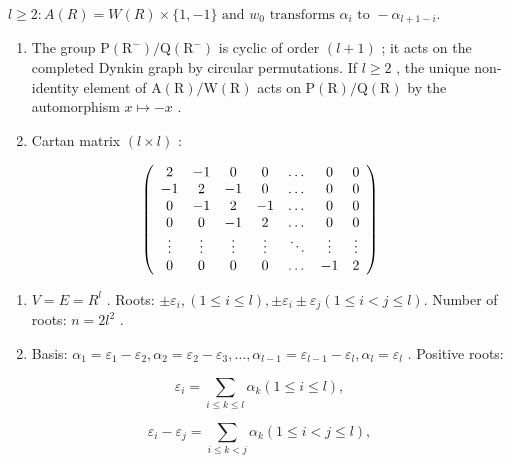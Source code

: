 \(l \geqslant 2: A(R) = W(R) \times \{1, -1\} \text{ and } w_{0} \text{ transforms } \alpha_{i} \text{ to } -\alpha_{l+1-i}.\)

\begin{enumerate}
\def\labelenumi{(\Roman{enumi})}
\setcounter{enumi}{11}
\item
  The group \(\mathrm{P}(\mathrm{R}^{-})/\mathrm{Q}(\mathrm{R}^{-})\) is cyclic of order \((l+1)\) ; it acts on the completed Dynkin graph by circular permutations. If \(l \geqslant 2\) , the unique non-identity element of \(\mathrm{A}(\mathrm{R})/\mathrm{W}(\mathrm{R})\) acts on \(\mathrm{P}(\mathrm{R})/\mathrm{Q}(\mathrm{R})\) by the automorphism \(x \mapsto -x\) .
\item
  Cartan matrix \((l \times l)\) :
\end{enumerate}

\[
\left( \begin{array}{c c c c c c c} 2 & - 1 & 0 & 0 & \dots & 0 & 0 \\ - 1 & 2 & - 1 & 0 & \dots & 0 & 0 \\ 0 & - 1 & 2 & - 1 & \dots & 0 & 0 \\ 0 & 0 & - 1 & 2 & \dots & 0 & 0 \\ \vdots & \vdots & \vdots & \vdots & \ddots & \vdots & \vdots \\ 0 & 0 & 0 & 0 & \dots & - 1 & 2 \end{array} \right)
\]


\begin{enumerate}
\def\labelenumi{(\Roman{enumi})}
\item
  \(V = E = R^{l}\) . Roots: \(\pm\varepsilon_{i}, (1\leqslant i\leqslant l), \pm\varepsilon_{i}\pm\varepsilon_{j} (1\leqslant i<j\leqslant l).\) Number of roots: \(n = 2l^{2}\) .
\item
  Basis: \(\alpha_{1} = \varepsilon_{1} - \varepsilon_{2},\alpha_{2} = \varepsilon_{2} - \varepsilon_{3},\ldots ,\alpha_{l - 1} = \varepsilon_{l - 1} - \varepsilon_{l},\alpha_{l} = \varepsilon_{l}\) . Positive roots:
\end{enumerate}

\[
\varepsilon_ {i} = \sum_ {i \leqslant k \leqslant l} \alpha_ {k} (1 \leqslant i \leqslant l),
\]

\[
\varepsilon_ {i} - \varepsilon_ {j} = \sum_ {i \leqslant k <   j} \alpha_ {k} (1 \leqslant i <   j \leqslant l),
\]

